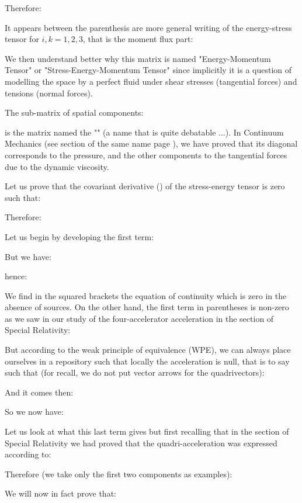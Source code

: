	Therefore:
	
	It appears between the parenthesis are more general writing of the energy-stress tensor for $i,k=1,2,3$, that is the moment flux part:
	
	
	We then understand better why this matrix is named "Energy-Momentum Tensor" or "Stress-Energy-Momentum Tensor" since implicitly it is a question of modelling the space by a perfect fluid under shear stresses (tangential forces) and tensions (normal forces).
	\begin{tcolorbox}[title=Remark,colframe=black,arc=10pt]
	The sub-matrix of spatial components:
	
	is the matrix named the "" (a name that is quite debatable ...). In Continuum Mechanics (see section of the same name page \pageref{navier stokes equations}), we have proved that its diagonal corresponds to the pressure, and the other components to the tangential forces due to the dynamic viscosity.
	\end{tcolorbox}
	Let us prove that the covariant derivative () of the stress-energy tensor is zero such that:
	
	Therefore:
	
	Let us begin by developing the first term:
	
	But we have:
	
	hence:
	
	We find in the squared brackets the equation of continuity which is zero in the absence of sources. On the other hand, the first term in parentheses is non-zero as we saw in our study of the four-accelerator acceleration in the section of Special Relativity:
	
	But according to the weak principle of equivalence (WPE), we can always place ourselves in a repository such that locally the acceleration is null, that is to say such that (for recall, we do not put vector arrows for the quadrivectors):
	
	And it comes then:
	
	So we now have:
	
	Let us look at what this last term gives but first recalling that in the section of Special Relativity we had proved that the quadri-acceleration was expressed according to:
	
	Therefore (we take only the first two components as examples):
	
	We will now in fact prove that:
	
